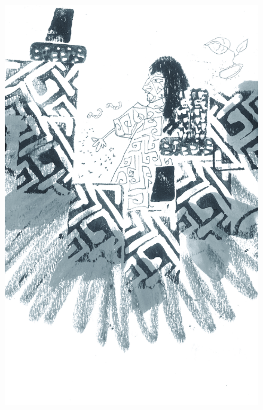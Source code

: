 \pagebreak
\thispagestyle{empty}
\begin{figure}[H]
\vspace*{-1.6cm}
\hspace*{-2.2cm}\includegraphics[width=138mm]{./imgs/img13.jpg}
\end{figure}



